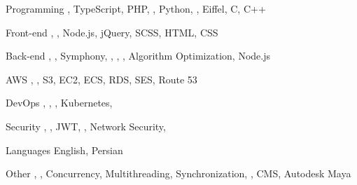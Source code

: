 

\begin{cvskills}

\cvskill
  {Programming} %
  {, TypeScript, PHP, , Python, , Eiffel, C, C++} %

\cvskill
  {Front-end} %
  {, , Node.js, jQuery, SCSS, HTML, CSS} %

\cvskill
  {Back-end} %
  {, , Symphony, , , , Algorithm Optimization, Node.js} %

\cvskill
  {AWS} %
  {, , S3, EC2, ECS, RDS, SES, Route 53} %

\cvskill
  {DevOps} %
  {, , , Kubernetes, } %

\cvskill
  {Security} %
  {, , JWT, , Network Security, } %

\cvskill
  {Languages} %
  {English, Persian} %

\cvskill
  {Other} %
  {, , Concurrency, Multithreading, Synchronization, , CMS, Autodesk Maya} %

\end{cvskills}
